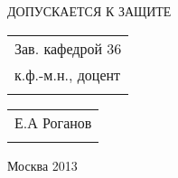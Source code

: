 \documentclass[a4paper,12pt,oneside]{memoir}
\begin{document}
\begin{center}
{\vspace{1cm plus 1mm minus 1mm}
ДОПУСКАЕТСЯ К ЗАЩИТЕ

\begin{tabular}{l}
Зав. кафедрой 36\\
к.ф.-м.н., доцент\\
\\
\end{tabular}
\hfill
\begin{tabular}{l}
\\
Е.А Роганов\\
\\
\end{tabular}
\vspace{2cm plus 1mm minus 1mm}

Москва 2013
}

\end{center}
\end{document}
